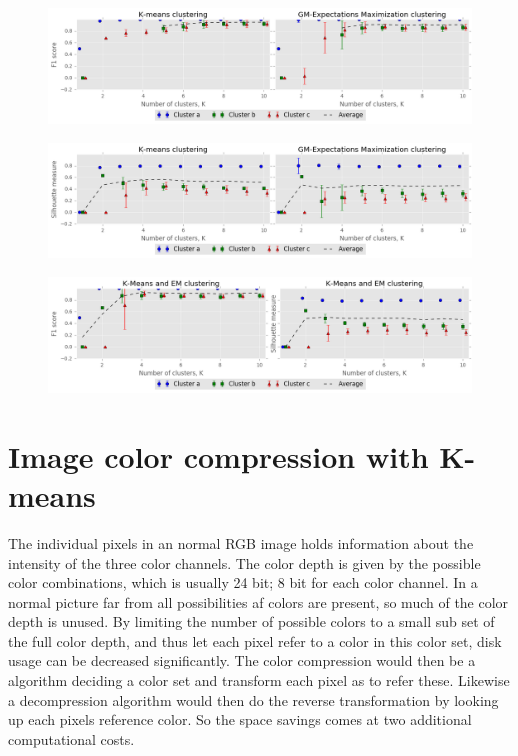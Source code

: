 \documentclass[a4paper,10pt,article,oneside,english]{memoir}
\let\oldcaption\caption
\renewcommand{\caption}[1]{\oldcaption{\emph{#1}}}
\begin{document}
\begin{figure}
	\centering
	\includegraphics[width=\textwidth]{f1_vs_k.png}
	\caption{}
	\label{fig:f1}
\end{figure}

\begin{figure}
	\centering
	\includegraphics[width=\textwidth]{silhouette_vs_k.png}
	\caption{}
	\label{fig:silhouette}
\end{figure}

\begin{figure}
	\centering
	\includegraphics[width=\textwidth]{combined_clustering.png}
	\caption{}
	\label{fig:combined_clustering}
\end{figure}

\section*{Image color compression with K-means}
The individual pixels in an normal RGB image holds information about the intensity of the three color channels. The color depth is given by the possible color combinations, which is usually 24 bit; 8 bit for each color channel. In a normal picture far from all possibilities af colors are present, so much of the color depth is unused. By limiting the number of possible colors to a small sub set of the full color depth, and thus let each pixel refer to a color in this color set, disk usage can be decreased significantly. The color compression would then be a algorithm deciding a color set and transform each pixel as to refer these. Likewise a decompression algorithm would then do the reverse transformation by looking up each pixels reference color. So the space savings comes at two additional computational costs.
\end{document}
